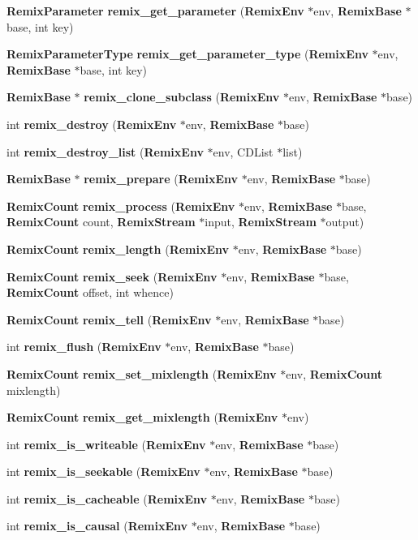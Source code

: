 \begin{CompactItemize}
\item 
{\bf Remix\-Parameter} {\bf remix\_\-get\_\-parameter} ({\bf Remix\-Env} $\ast$env, {\bf Remix\-Base} $\ast$base, int key)
\item 
{\bf Remix\-Parameter\-Type} {\bf remix\_\-get\_\-parameter\_\-type} ({\bf Remix\-Env} $\ast$env, {\bf Remix\-Base} $\ast$base, int key)
\item 
{\bf Remix\-Base} $\ast$ {\bf remix\_\-clone\_\-subclass} ({\bf Remix\-Env} $\ast$env, {\bf Remix\-Base} $\ast$base)
\item 
int {\bf remix\_\-destroy} ({\bf Remix\-Env} $\ast$env, {\bf Remix\-Base} $\ast$base)
\item 
int {\bf remix\_\-destroy\_\-list} ({\bf Remix\-Env} $\ast$env, CDList $\ast$list)
\item 
{\bf Remix\-Base} $\ast$ {\bf remix\_\-prepare} ({\bf Remix\-Env} $\ast$env, {\bf Remix\-Base} $\ast$base)
\item 
{\bf Remix\-Count} {\bf remix\_\-process} ({\bf Remix\-Env} $\ast$env, {\bf Remix\-Base} $\ast$base, {\bf Remix\-Count} count, {\bf Remix\-Stream} $\ast$input, {\bf Remix\-Stream} $\ast$output)
\item 
{\bf Remix\-Count} {\bf remix\_\-length} ({\bf Remix\-Env} $\ast$env, {\bf Remix\-Base} $\ast$base)
\item 
{\bf Remix\-Count} {\bf remix\_\-seek} ({\bf Remix\-Env} $\ast$env, {\bf Remix\-Base} $\ast$base, {\bf Remix\-Count} offset, int whence)
\item 
{\bf Remix\-Count} {\bf remix\_\-tell} ({\bf Remix\-Env} $\ast$env, {\bf Remix\-Base} $\ast$base)
\item 
int {\bf remix\_\-flush} ({\bf Remix\-Env} $\ast$env, {\bf Remix\-Base} $\ast$base)
\item 
{\bf Remix\-Count} {\bf remix\_\-set\_\-mixlength} ({\bf Remix\-Env} $\ast$env, {\bf Remix\-Count} mixlength)
\item 
{\bf Remix\-Count} {\bf remix\_\-get\_\-mixlength} ({\bf Remix\-Env} $\ast$env)
\item 
int {\bf remix\_\-is\_\-writeable} ({\bf Remix\-Env} $\ast$env, {\bf Remix\-Base} $\ast$base)
\item 
int {\bf remix\_\-is\_\-seekable} ({\bf Remix\-Env} $\ast$env, {\bf Remix\-Base} $\ast$base)
\item 
int {\bf remix\_\-is\_\-cacheable} ({\bf Remix\-Env} $\ast$env, {\bf Remix\-Base} $\ast$base)
\item 
int {\bf remix\_\-is\_\-causal} ({\bf Remix\-Env} $\ast$env, {\bf Remix\-Base} $\ast$base)

\end{CompactItemize}
